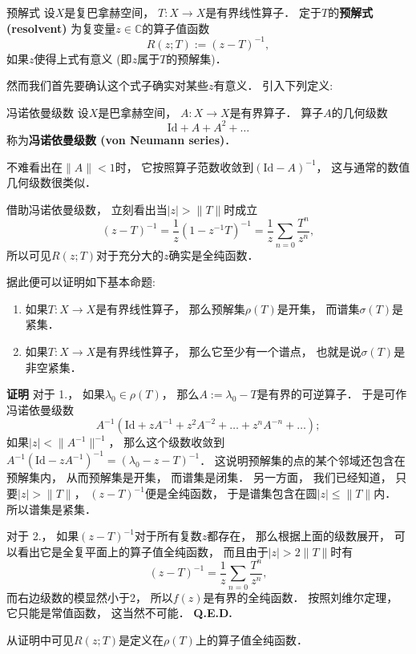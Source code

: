 

\begin{definition}{预解式}
设$X$是复巴拿赫空间， $T:X\to X$是有界线性算子． 定于$T$的\textbf{预解式 (resolvent)} 为复变量$z\in\mathbb{C}$的算子值函数
$$
R(z;T):=(z-T)^{-1},
$$
如果$z$使得上式有意义 (即$z$属于$T$的预解集)．
\end{definition}

然而我们首先要确认这个式子确实对某些$z$有意义． 引入下列定义:

\begin{definition}{冯诺依曼级数}
设$X$是巴拿赫空间， $A:X\to X$是有界算子． 算子$A$的几何级数
$$
\text{Id}+A+A^2+\dots
$$
称为\textbf{冯诺依曼级数 (von Neumann series)}．
\end{definition}
不难看出在$\|A\|<1$时， 它按照算子范数收敛到$(\text{Id}-A)^{-1}$， 这与通常的数值几何级数很类似． 

借助冯诺依曼级数， 立刻看出当$|z|>\|T\|$时成立
$$
(z-T)^{-1}
=\frac{1}{z}(1-z^{-1}T)^{-1}
=\frac{1}{z}\sum_{n=0}\frac{T^n}{z^n},
$$
所以可见$R(z;T)$对于充分大的$z$确实是全纯函数．

据此便可以证明如下基本命题:

\begin{theorem}{}
\begin{enumerate}
\item 如果$T:X\to X$是有界线性算子， 那么预解集$\rho(T)$是开集， 而谱集$\sigma(T)$是紧集．
\item 如果$T:X\to X$是有界线性算子， 那么它至少有一个谱点， 也就是说$\sigma(T)$是非空紧集．
\end{enumerate}
\end{theorem}
\textbf{证明} 
对于 1.， 如果$\lambda_0\in\rho(T)$， 那么$A:=\lambda_0-T$是有界的可逆算子． 于是可作冯诺依曼级数
$$
A^{-1}(\text{Id}+zA^{-1}+z^2A^{-2}+\dots+z^nA^{-n}+\dots);
$$
如果$|z|<\|A^{-1}\|^{-1}$， 那么这个级数收敛到 $A^{-1}(\text{Id}-zA^{-1})^{-1}=(\lambda_0-z-T)^{-1}$． 这说明预解集的点的某个邻域还包含在预解集内， 从而预解集是开集， 而谱集是闭集． 另一方面， 我们已经知道， 只要$|z|>\|T\|$， $(z-T)^{-1}$便是全纯函数， 于是谱集包含在圆$|z|\leq\|T\|$内． 所以谱集是紧集．

对于 2.， 如果$(z-T)^{-1}$对于所有复数$z$都存在， 那么根据上面的级数展开， 可以看出它是全复平面上的算子值全纯函数， 而且由于$|z|>2\|T\|$时有
$$
(z-T)^{-1}=\frac{1}{z}\sum_{n=0}\frac{T^n}{z^n},
$$
而右边级数的模显然小于2， 所以$f(z)$是有界的全纯函数． 按照刘维尔定理， 它只能是常值函数， 这当然不可能． \textbf{Q.E.D.}

从证明中可见$R(z;T)$是定义在$\rho(T)$上的算子值全纯函数．